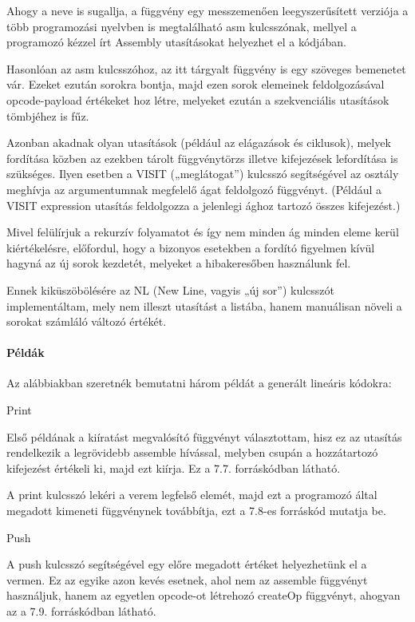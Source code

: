 Ahogy a neve is sugallja, a függvény egy messzemenően leegyszerűsített verziója a több programozási nyelvben is megtalálható asm kulcsszónak, mellyel a programozó kézzel írt Assembly utasításokat helyezhet el a kódjában.

Hasonlóan az asm kulcsszóhoz, az itt tárgyalt függvény is egy szöveges bemenetet vár. Ezeket ezután sorokra bontja, majd ezen sorok elemeinek feldolgozásával opcode-payload értékeket hoz létre, melyeket ezután a szekvenciális utasítások tömbjéhez is fűz.

Azonban akadnak olyan utasítások (például az elágazások és ciklusok), melyek fordítása közben az ezekben tárolt függvénytörzs illetve kifejezések lefordítása is szükséges. Ilyen esetben a VISIT („meglátogat”) kulcsszó segítségével az osztály meghívja az argumentumnak megfelelő ágat feldolgozó függvényt. (Például a VISIT expression utasítás feldolgozza a jelenlegi ághoz tartozó összes kifejezést.)

Mivel felülírjuk a rekurzív folyamatot és így nem minden ág minden eleme kerül kiértékelésre, előfordul, hogy a bizonyos esetekben a fordító figyelmen kívül hagyná az új sorok kezdetét, melyeket a hibakeresőben használunk fel.

Ennek kiküszöbölésére az NL (New Line, vagyis „új sor”) kulcsszót implementáltam, mely nem illeszt utasítást a listába, hanem manuálisan növeli a sorokat számláló változó értékét.

\paragraph{Példák}

Az alábbiakban szeretnék bemutatni három példát a generált lineáris kódokra:

Print

Első példának a kiíratást megvalósító függvényt választottam, hisz ez az utasítás rendelkezik a legrövidebb assemble hívással, melyben csupán a hozzátartozó kifejezést értékeli ki, majd ezt kiírja. Ez a 7.7. forráskódban látható.

A print kulcsszó lekéri a verem legfelső elemét, majd ezt a programozó által megadott kimeneti függvénynek továbbítja, ezt a 7.8-es forráskód mutatja be. 

Push

A push kulcsszó segítségével egy előre megadott értéket helyezhetünk el a vermen. Ez az egyike azon kevés esetnek, ahol nem az assemble függvényt használjuk, hanem az egyetlen opcode-ot létrehozó createOp függvényt, ahogyan az a 7.9. forráskódban látható.


